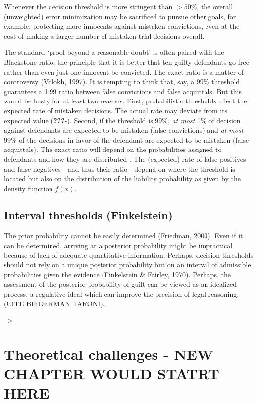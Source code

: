 \documentclass[10pt,dvipsnames,enabledeprecatedfontcommands]{scrartcl}
\begin{document}
Whenever the decision threshold is more stringent than \(>50\%\), the
overall (unweighted) error minimization may be sacrificed to pursue
other goals, for example, protecting more innocents against mistaken
convictions, even at the cost of making a larger number of mistaken
trial decisions overall.

The standard `proof beyond a reasonable doubt' is often paired with the
Blackstone ratio, the principle that it is better that ten guilty
defendants go free rather than even just one innocent be convicted. The
exact ratio is a matter of controversy (Volokh, 1997). It is tempting to
think that, say, a 99\% threshold guarantees a 1:99 ratio between false
convictions and false acquittals. But this would be hasty for at least
two reasons. First, probabilistic thresholds affect the expected rate of
mistaken decisions. The actual rate may deviate from its expected value
({\textbf{???}}-). Second, if the threshold is \(99\%\),
\textit{at most} 1\% of decision against defendants are expected to be
mistaken (false convictions) and \textit{at most} 99\% of the decisions
in favor of the defendant are expected to be mistaken (false
acquittals). The exact ratio will depend on the probabilities assigned
to defendants and how they are distributed \citep{allen2014}. The
(expected) rate of false positives and false negatives---and thus their
ratio---depend on where the threshold is located but also on the
distribution of the liability probability as given by the density
function \(f(x)\).

\hypertarget{interval-thresholds-finkelstein}{%
\subsection{Interval thresholds
(Finkelstein)}\label{interval-thresholds-finkelstein}}

The prior probability cannot be easily determined (Friedman, 2000). Even
if it can be determined, arriving at a posterior probability might be
impractical because of lack of adequate quantitative information.
Perhaps, decision thresholds should not rely on a unique posterior
probability but on an interval of admissible probabilities given the
evidence (Finkelstein \& Fairley, 1970). Perhaps, the assessment of the
posterior probability of guilt can be viewed as an idealized process, a
regulative ideal which can improve the precision of legal reasoning.
(CITE BIEDERMAN TARONI).

--\textgreater{}

\hypertarget{theoretical-challenges---new-chapter-would-statrt-here}{%
\section{Theoretical challenges - NEW CHAPTER WOULD STATRT
HERE}\label{theoretical-challenges---new-chapter-would-statrt-here}}
\end{document}
